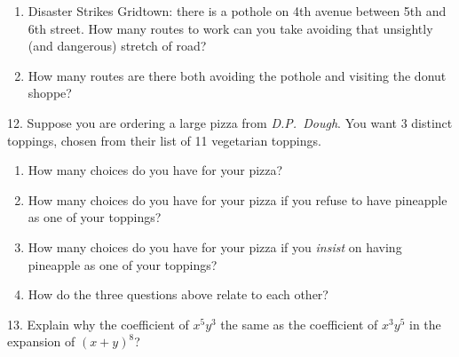 \documentclass[10pt,]{book}
\theoremstyle{plain}
\theoremstyle{definition}
\theoremstyle{definition}
\theoremstyle{definition}
\theoremstyle{definition}
\numberwithin{equation}{chapter}
\begin{document}
\begin{exerciselist}
\begin{enumerate}[label=(\alph*)]
\item\hypertarget{li-416}{}\hypertarget{p-879}{}%
Disaster Strikes Gridtown: there is a pothole on 4th avenue between 5th and 6th street. How many routes to work can you take avoiding that unsightly (and dangerous) stretch of road? %
\item\hypertarget{li-417}{}\hypertarget{p-880}{}%
How many routes are there both avoiding the pothole and visiting the donut shoppe? %
\end{enumerate}
%
\par\smallskip
\item[12.]\hypertarget{exercise-109}{}\hypertarget{p-881}{}%
Suppose you are ordering a large pizza from \emph{D.P.~Dough}. You want 3 distinct toppings, chosen from their list of 11 vegetarian toppings. \leavevmode%
\begin{enumerate}[label=(\alph*)]
\item\hypertarget{li-418}{}\hypertarget{p-882}{}%
How many choices do you have for your pizza?%
\item\hypertarget{li-419}{}\hypertarget{p-883}{}%
How many choices do you have for your pizza if you refuse to have pineapple as one of your toppings?%
\item\hypertarget{li-420}{}\hypertarget{p-884}{}%
How many choices do you have for your pizza if you \emph{insist} on having pineapple as one of your toppings?%
\item\hypertarget{li-421}{}\hypertarget{p-885}{}%
How do the three questions above relate to each other?%
\end{enumerate}
%
\par\smallskip
\item[13.]\hypertarget{exercise-110}{}\hypertarget{p-886}{}%
Explain why the coefficient of \(x^5y^3\) the same as the coefficient of \(x^3y^5\) in the expansion of \((x+y)^8\)?%
\par\smallskip
\end{exerciselist}
\typeout{************************************************}
\typeout{************************************************}
\end{document}

